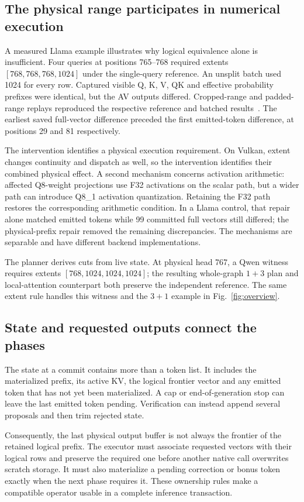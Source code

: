 \subsection{The physical range participates in numerical execution}
A measured Llama example illustrates why logical equivalence alone is insufficient. Four queries at positions 765--768 required extents $[768,768,768,1024]$ under the single-query reference. An unsplit batch used 1024 for every row. Captured visible Q, K, V, QK and effective probability prefixes were identical, but the AV outputs differed. Cropped-range and padded-range replays reproduced the respective reference and batched results~\cite{records}. The earliest saved full-vector difference preceded the first emitted-token difference, at positions 29 and 81 respectively.

The intervention identifies a physical execution requirement. On Vulkan, extent changes continuity and dispatch as well, so the intervention identifies their combined physical effect. A second mechanism concerns activation arithmetic: affected Q8-weight projections use F32 activations on the scalar path, but a wider path can introduce Q8\_1 activation quantization. Retaining the F32 path restores the corresponding arithmetic condition. In a Llama control, that repair alone matched emitted tokens while 99 committed full vectors still differed; the physical-prefix repair removed the remaining discrepancies. The mechanisms are separable and have different backend implementations.

The planner derives cuts from live state. At physical head 767, a Qwen witness requires extents $[768,1024,1024,1024]$; the resulting whole-graph $1+3$ plan and local-attention counterpart both preserve the independent reference. The same extent rule handles this witness and the $3+1$ example in Fig.~\ref{fig:overview}.

\subsection{State and requested outputs connect the phases}
The state at a commit contains more than a token list. It includes the materialized prefix, its active KV, the logical frontier vector and any emitted token that has not yet been materialized. A cap or end-of-generation stop can leave the last emitted token pending. Verification can instead append several proposals and then trim rejected state.

Consequently, the last physical output buffer is not always the frontier of the retained logical prefix. The executor must associate requested vectors with their logical rows and preserve the required one before another native call overwrites scratch storage. It must also materialize a pending correction or bonus token exactly when the next phase requires it. These ownership rules make a compatible operator usable in a complete inference transaction.

